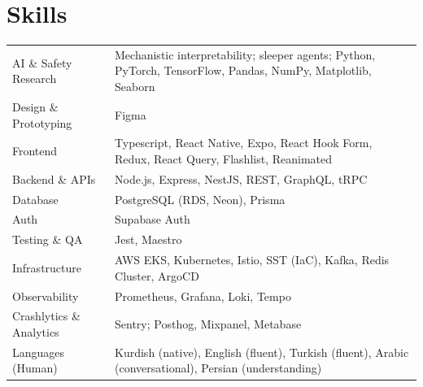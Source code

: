 \documentclass[a4paper,12pt]{article}
\begin{document}
\section{Skills}
\begin{tabularx}{\linewidth}{@{}l X@{}}
AI \& Safety Research &  \normalsize{Mechanistic interpretability; sleeper agents; Python, PyTorch, TensorFlow, Pandas, NumPy, Matplotlib, Seaborn}\\
Design \& Prototyping &  \normalsize{Figma}\\
Frontend  &  \normalsize{Typescript, React Native, Expo, React Hook Form, Redux, React Query, Flashlist, Reanimated}\\  
Backend \& APIs & \normalsize{Node.js, Express, NestJS, REST, GraphQL, tRPC}\\
Database & \normalsize{PostgreSQL (RDS, Neon), Prisma}\\
Auth & \normalsize{Supabase Auth}\\
Testing \& QA & \normalsize{Jest, Maestro}\\
Infrastructure & \normalsize{AWS EKS, Kubernetes, Istio, SST (IaC), Kafka, Redis Cluster, ArgoCD}\\
Observability & \normalsize{Prometheus, Grafana, Loki, Tempo}\\
Crashlytics \& Analytics & \normalsize{Sentry; Posthog, Mixpanel, Metabase}\\
Languages (Human) & \normalsize{Kurdish (native), English (fluent), Turkish (fluent), Arabic (conversational), Persian (understanding)}\\
\end{tabularx}

\vfill
{}
\end{document}
